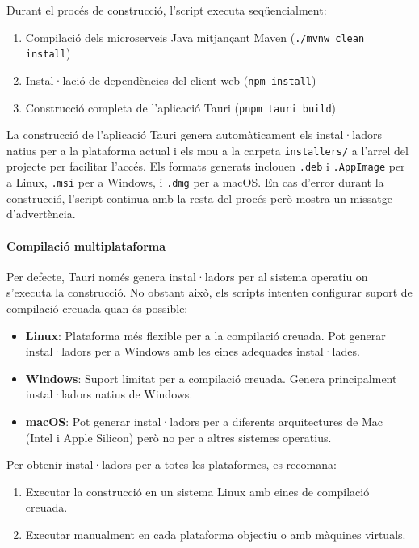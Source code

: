 Durant el procés de construcció, l'script executa seqüencialment:

\begin{enumerate}
  \item Compilació dels microserveis Java mitjançant Maven (\texttt{./mvnw clean install})
  \item Instal·lació de dependències del client web (\texttt{npm install})
  \item Construcció completa de l'aplicació Tauri (\texttt{pnpm tauri build})
\end{enumerate}

La construcció de l'aplicació Tauri genera automàticament els instal·ladors natius per a la plataforma actual i els mou a la carpeta \texttt{installers/} a l'arrel del projecte per facilitar l'accés. Els formats generats inclouen \texttt{.deb} i \texttt{.AppImage} per a Linux, \texttt{.msi} per a Windows, i \texttt{.dmg} per a macOS. En cas d'error durant la construcció, l'script continua amb la resta del procés però mostra un missatge d'advertència.

\paragraph{Compilació multiplataforma}

Per defecte, Tauri només genera instal·ladors per al sistema operatiu on s'executa la construcció. No obstant això, els scripts intenten configurar suport de compilació creuada quan és possible:

\begin{itemize}
  \item \textbf{Linux}: Plataforma més flexible per a la compilació creuada. Pot generar instal·ladors per a Windows amb les eines adequades instal·lades.
  \item \textbf{Windows}: Suport limitat per a compilació creuada. Genera principalment instal·ladors natius de Windows.
  \item \textbf{macOS}: Pot generar instal·ladors per a diferents arquitectures de Mac (Intel i Apple Silicon) però no per a altres sistemes operatius.
\end{itemize}

Per obtenir instal·ladors per a totes les plataformes, es recomana:
\begin{enumerate}
  \item Executar la construcció en un sistema Linux amb eines de compilació creuada.
  \item Executar manualment en cada plataforma objectiu o amb màquines virtuals.
\end{enumerate}

